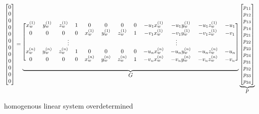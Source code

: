 \setcounter{MaxMatrixCols}{20}
\begin{equation}
    \scalemath{0.9}{
    \begin{bmatrix}
        0 \\ 0 \\ 0 \\ 0 \\ 0 \\ 0 \\ 0 \\ 0 \\ 0 \\ 0 \\ 0 \\ 0
    \end{bmatrix}
    =
    \underbrace{
        \begin{blockarray}{[*{12}c]}
            x_w^{(1)} & y_w^{(1)} & z_w^{(1)} & 1 & 0         & 0         & 0         & 0 & -u_1 x_w^{(1)} & -u_1 y_w^{(1)} & -u_1 z_w^{(1)} & -u_1 \\
            0         & 0         & 0         & 0 & x_w^{(1)} & y_w^{(1)} & z_w^{(1)} & 1 & -v_1 x_w^{(1)} & -v_1 y_w^{(1)} & -v_1 z_w^{(1)} & -v_1 \\
            \BAmulticolumn{6}{c}{\vdots} & \BAmulticolumn{6}{c}{\vdots} \\
            x_w^{(n)} & y_w^{(n)} & z_w^{(n)} & 1 & 0         & 0         & 0         & 0 & -u_n x_w^{(n)} & -u_n y_w^{(n)} & -u_n z_w^{(n)} & -u_n \\
            0         & 0         & 0         & 0 & x_w^{(n)} & y_w^{(n)} & z_w^{(n)} & 1 & -v_n x_w^{(n)} & -v_n y_w^{(n)} & -v_n z_w^{(n)} & -v_n
        \end{blockarray}
    }_{\mathlarger{G}}
    \underbrace{
        \begin{bmatrix}
            p_{11} \\ p_{12} \\ p_{13} \\ p_{14} \\ p_{21} \\ p_{22} \\ p_{23} \\ p_{24} \\ p_{31} \\ p_{32} \\ p_{33} \\ p_{34}
        \end{bmatrix}
    }_{\mathlarger{p}}
    }
\end{equation}

homogenous linear system
overdetermined 


